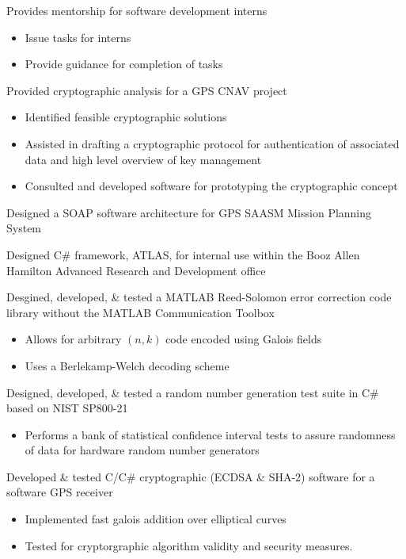 \documentclass[letterpaper]{clinton-resume}
\begin{document}
\begin{minipage}[t]{0.66\textwidth}
\begin{tightitemize}
\item Provides mentorship for software development interns
	\begin{itemize}
	\item Issue tasks for interns
	\item Provide guidance for completion of tasks
	\end{itemize}
\item Provided cryptographic analysis for a GPS CNAV project
	\begin{itemize}
	\item Identified feasible cryptographic solutions
	\item Assisted in drafting a cryptographic protocol for authentication of associated data and high level overview of key management
	\item Consulted and developed software for prototyping the cryptographic concept
	\end{itemize}
\item Designed a SOAP software architecture for GPS SAASM Mission Planning System
\item Designed C\# framework, ATLAS, for internal use within the Booz Allen Hamilton Advanced Research and Development office
\item Desgined, developed, \& tested a MATLAB Reed-Solomon error correction code library without the MATLAB Communication Toolbox
	\begin{itemize}
	\item Allows for arbitrary $(n,k)$ code encoded using Galois fields
	\item Uses a Berlekamp-Welch decoding scheme
	\end{itemize}
\item Designed, developed, \& tested a random number generation test suite in C\# based on NIST SP800-21
	\begin{itemize}
	\item Performs a bank of statistical confidence interval tests to assure randomness of data for hardware random number generators
	\end{itemize}
\item Developed \& tested C/C\# cryptographic (ECDSA \& SHA-2) software for a software GPS receiver 
\begin{itemize}
\item  Implemented fast galois addition over elliptical curves
\item Tested for cryptorgraphic algorithm validity and security measures.
\end{itemize}

\end{tightitemize}
\end{minipage}
\end{document}
